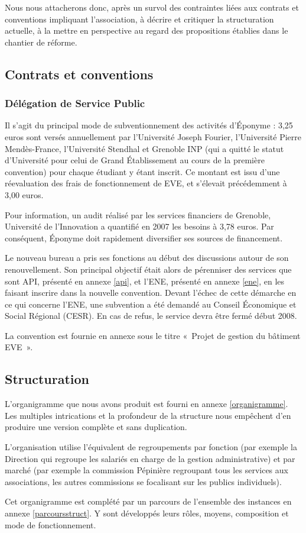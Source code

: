 Nous nous attacherons donc, après un survol des contraintes liées aux contrats
et conventions impliquant l'association, à décrire et critiquer la
structuration actuelle, à la mettre en perspective au regard des propositions
établies dans le chantier de réforme.

\subsection{Contrats et conventions}
\label{contrats}

\subsubsection{Délégation de Service Public}

Il s'agit du principal mode de subventionnement des activités d'Éponyme :
3,25 euros sont versés annuellement par l'Université Joseph Fourier,
l'Université Pierre Mendès-France, l'Université Stendhal et Grenoble INP
(qui a quitté le statut d'Université pour celui de Grand Établissement
 au cours de la première convention) pour chaque étudiant y étant inscrit.
Ce montant est issu d'une réevaluation des frais de fonctionnement de EVE,
et s'élevait précédemment à 3,00 euros.

Pour information, un audit réalisé par les services financiers de Grenoble,
Université de l'Innovation a quantifié en 2007 les besoins à 3,78 euros.
Par conséquent, Éponyme doit rapidement diversifier ses sources de financement.

Le nouveau bureau a pris ses fonctions au début des discussions autour de
son renouvellement. Son principal objectif était alors de pérenniser des
services que sont API, présenté en annexe \ref{api}, et l'ENE, présenté en annexe \ref{ene},
en les faisant inscrire dans la nouvelle
convention. Devant l'échec de cette démarche en ce qui concerne l'ENE, une
subvention a été demandé au Conseil Économique et Social Régional (CESR).
En cas de refus, le service devra être fermé début 2008.

La convention est fournie en annexe sous le titre
«~Projet de gestion du bâtiment EVE~».

\subsection{Structuration}
\label{structuration}

L'organigramme que nous avons produit est fourni en annexe \ref{organigramme}.
Les multiples intrications et la profondeur de la structure nous empêchent
d'en produire une version complète et sans duplication.

L'organisation utilise l'équivalent de regroupements par fonction (par exemple
la Direction qui regroupe les salariés en charge de la gestion administrative)
et par marché (par exemple la commission Pépinière regroupant tous les services
aux associations, les autres commissions se focalisant sur les publics
individuels).

Cet organigramme est complété par un parcours de l'ensemble des instances en
annexe \ref{parcoursstruct}. Y sont développés leurs rôles, moyens,
composition et mode de fonctionnement.

\label{api}
\label{ene}
